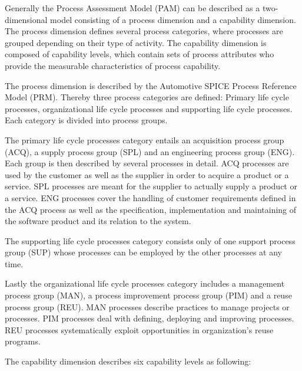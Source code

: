 Generally the \cite{AUTOSPICE} Process Assessment Model (PAM) can be described as a two-dimensional model consisting of a process dimension 
and a capability dimension. The process dimension defines several process categories, where processes are grouped depending on their type of 
activity. The capability dimension is composed of capability levels, which contain sets of process attributes who provide the measurable 
characteristics of process capability.

The process dimension is described by the Automotive SPICE Process Reference Model (PRM). Thereby three process categories are defined: Primary life
cycle processes, organizational life cycle processes and supporting life cycle processes. Each category is divided into process groups.

The primary life cycle processes category entails an acquisition process group (ACQ), a supply process group (SPL) and an engineering process 
group (ENG). Each group is then described by several processes in detail. ACQ processes are used by the customer as well as the supplier in 
order to acquire a product or a service. SPL processes are meant for the supplier to actually supply a product or a service. ENG processes 
cover the handling of customer requirements defined in the ACQ process as well as the specification, implementation and maintaining of the 
software product and its relation to the system.

The supporting life cycle processes category consists only of one support process group (SUP) whose processes can be employed by the other processes at any time.

Lastly the organizational life cycle processes category includes a management process group (MAN), a process improvement process group (PIM) 
and a reuse process group (REU). MAN processes describe practices to manage projects or processes. PIM processes deal with defining, deploying 
and improving processes. REU processes systematically exploit opportunities in organization’s reuse programs.

The capability dimension describes six capability levels as following:

